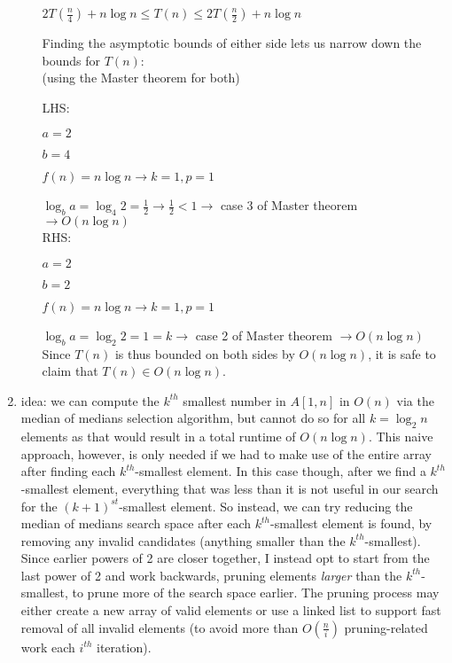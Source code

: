 \documentclass[12pt]{article}
\begin{document}
\begin{enumerate}
\begin{enumerate}
        \centerline{$2T(\frac{n}{4}) + n\log n \leq T(n) \leq 2T(\frac{n}{2}) + n\log n$}

        Finding the asymptotic bounds of either side lets us narrow down the bounds for $T(n)$:\\

        (using the Master theorem for both)

        LHS:

        $a = 2$

        $b = 4$

        $f(n) = n\log n \longrightarrow k = 1, p = 1$

        $\log_{b}{a} = \log_{4}{2} = \frac{1}{2} \longrightarrow \frac{1}{2} < 1 \longrightarrow$ case 3 of Master theorem
        $\longrightarrow O(n\log n)$\\

        RHS:

        $a = 2$

        $b = 2$

        $f(n) = n\log n \longrightarrow k = 1, p = 1$

        $\log_{b}{a} = \log_{2}{2} = 1 = k \longrightarrow$ case 2 of Master theorem 
        $\longrightarrow O(n\log n)$\\

        Since $T(n)$ is thus bounded on both sides by $O(n\log n)$, it is safe to claim that $T(n) \in O(n\log n)$.

    \end{enumerate}
    \item idea: we can compute the $k^{th}$ smallest number in $A[1, n]$ in $O(n)$ via the median of medians selection 
    algorithm, but cannot do so for all $k = \log_2n$ elements as that would result in a total runtime of $O(n\log n)$. 
    This naive approach, however, is only needed if we had to make use of the entire array after finding each $k^{th}$-smallest 
    element. In this case though, after we find a $k^{th}$-smallest element, everything that was less than it is not useful 
    in our search for the $(k+1)^{st}$-smallest element. So instead, we can try reducing the median of medians search space 
    after each $k^{th}$-smallest element is found, by removing any invalid candidates (anything smaller than the $k^{th}$-smallest). 
    Since earlier powers of 2 are closer together, I instead opt to start from the last power of 2 and work backwards, pruning 
    elements \textit{larger} than the $k^{th}$-smallest, to prune more of the search space earlier. The pruning process 
    may either create a new array of valid elements or use a linked list to support fast removal of all invalid elements 
    (to avoid more than $O(\frac{n}{i})$ pruning-related work each $i^{th}$ iteration).


\end{enumerate}
\end{document}
